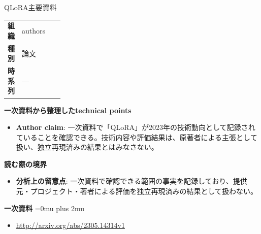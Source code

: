 \begin{technicalnote}{QLoRA}{主要資料}
\begingroup
\begin{tabularx}{\linewidth}{@{}>{\bfseries}p{0.22\linewidth}X@{}}
組織 & authors \\
種別 & 論文 \\
時系列 & — \\
\end{tabularx}
\smallskip
{\bfseries 一次資料から整理したtechnical points}
\begin{itemize}[leftmargin=1.5em,itemsep=0.35em]
\item \textbf{Author claim}: 一次資料で「QLoRA」が2023年の技術動向として記録されていることを確認できる。技術内容や評価結果は、原著者による主張として扱い、独立再現済みの結果とはみなさない。
\end{itemize}
\begin{minipage}{\linewidth}
{\bfseries 読む際の境界}
\begin{itemize}[leftmargin=1.5em,itemsep=0.35em]
\item \textbf{分析上の留意点}: 一次資料で確認できる範囲の事実を記録しており、提供元・プロジェクト・著者による評価を独立再現済みの結果として扱わない。
\end{itemize}
\begin{samepage}
{\bfseries 一次資料}
\begingroup\sloppy
\Urlmuskip=0mu plus 2mu\relax
\begin{itemize}[leftmargin=1.5em,itemsep=0.25em]
\item {\scriptsize\url{http://arxiv.org/abs/2305.14314v1}}
\end{itemize}
\endgroup
\end{samepage}
\end{minipage}
\endgroup
\end{technicalnote}
\medskip

